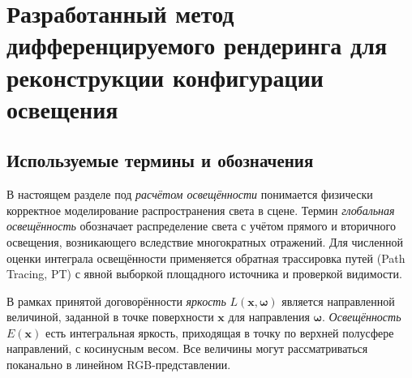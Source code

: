 %

\chapter{Разработанный метод дифференцируемого рендеринга для реконструкции конфигурации освещения}
\label{ch:light-method}

\section{Используемые термины и обозначения}

В настоящем разделе под \emph{расчётом освещённости} понимается физически корректное моделирование распространения света в сцене. Термин \emph{глобальная освещённость} обозначает распределение света с учётом прямого и вторичного освещения, возникающего вследствие многократных отражений. Для численной оценки интеграла освещённости применяется обратная трассировка путей (Path Tracing, PT) с явной выборкой площадного источника и проверкой видимости.

В рамках принятой договорённости \emph{яркость} $L(\mathbf{x},\boldsymbol{\omega})$ является направленной величиной, заданной в точке поверхности $\mathbf{x}$ для направления $\boldsymbol{\omega}$. \emph{Освещённость} $E(\mathbf{x})$ есть интегральная яркость, приходящая в точку по верхней полусфере направлений, с косинусным весом. Все величины могут рассматриваться поканально в линейном RGB-представлении.

